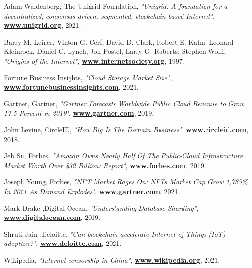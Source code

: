\documentclass{article}
\let\oldhref\href
\renewcommand{\href}[2]{\oldhref{#1}{\bfseries#2}}
\begin{document}
\newpage
\begin{thebibliography}{999}
    Adam Waldenberg, The Unigrid Foundation,
    \emph{"Unigrid: A foundation for a decentralized, consensus-driven, segmented, blockchain-based Internet"},
    \href{https://www.unigrid.org/about}{www.unigrid.org},
    2021.

    Barry M. Leiner, Vinton G. Cerf, David D. Clark, Robert E. Kahn, Leonard Kleinrock, Daniel C. Lynch, Jon Postel, Larry G. Roberts, Stephen Wolff,
    \emph{"Origins of the Internet"},
    \href{https://www.internetsociety.org/internet/history-internet/brief-history-internet}{www.internetsociety.org},
    1997.

    Fortune Business Insights,
    \emph{"Cloud Storage Market Size"},
    \href{https://www.fortunebusinessinsights.com/cloud-storage-market-102773}{www.fortunebusinessinsights.com},
    2021.

    Gartner, Gartner,
    \emph{"Gartner Forecasts Worldwide Public Cloud Revenue to Grow 17.5 Percent in 2019"},
    \href{https://www.gartner.com/en/newsroom/press-releases/2019-04-02-gartner-forecasts-worldwide-public-cloud-revenue-to-g}{www.gartner.com},
    2019.

    John Levine, CircleID,
    \emph{"How Big Is The Domain Business"},
    \href{https://www.circleid.com/posts/20180813_how_big_is_the_domain_business/}{www.circleid.com},
    2018.

    Jeb Su, Forbes,
    \emph{"Amazon Owns Nearly Half Of The Public-Cloud Infrastructure Market Worth Over \$32 Billion: Report"},
    \href{https://www.forbes.com/sites/jeanbaptiste/2019/08/02/amazon-owns-nearly-half-of-the-public-cloud-infrastructure-market-worth-over-32-billion-report/ }{www.forbes.com},
    2019.

    Joseph Young, Forbes,
    \emph{"NFT Market Rages On: NFTs Market Cap Grow 1,785\% In 2021 As Demand Explodes"},
    \href{https://www.forbes.com/sites/youngjoseph/2021/03/29/nft-market-rages-on-nfts-market-cap-grow-1785-in-2021-as-demand-explodes/
}{www.gartner.com},
    2021.

    Mark Drake ,Digital Ocean,
    \emph{"Understanding Database Sharding"},
    \href{https://www.digitalocean.com/community/tutorials/understanding-database-sharding}{www.digitalocean.com},
    2019.

    Shruti Jain ,Deloitte,
    \emph{"Can blockchain accelerate Internet of Things (IoT) adoption?"},
    \href{https://www2.deloitte.com/ch/en/pages/innovation/articles/blockchain-accelerate-iot-adoption.html}{www.deloitte.com},
    2021.

    Wikipedia,
    \emph{"Internet censorship in China"},
    \href{https://www.wikipedia.org/wiki/Internet_censorship_in_China}{www.wikipedia.org},
    2021.
\end{thebibliography}
\end{document}
